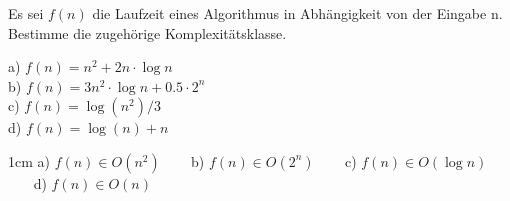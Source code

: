 \question[4]
Es sei $f(n)$ die Laufzeit eines Algorithmus in Abhängigkeit von der Eingabe n. Bestimme die zugehörige
Komplexitätsklasse.

a) $f(n) = n^2 + 2n \cdot \log n $  \\
b) $f(n) = 3n^2\cdot\log n + 0.5\cdot 2^n$ \\
c) $f(n) = \log(n^2) / 3$ \\
d) $f(n) = \log(n) + n$ \\
\begin{solutionbox}{1cm}
a) $f(n) \in O(n^2)$  ~~~
b) $f(n) \in O(2^n)$  ~~~
c) $f(n) \in O(\log n)$  ~~~
d) $f(n) \in O(n)$
\end{solutionbox}
